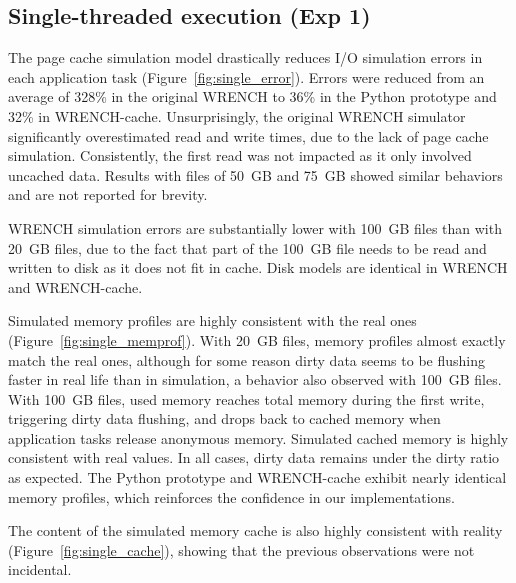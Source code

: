 \documentclass[conference]{IEEEtran}
\newcommand{\wrench}{WRENCH\xspace}
\begin{document}
        \subsection{Single-threaded execution (Exp 1)}


        The page cache simulation model drastically reduces I/O simulation
        errors in each application task (Figure~\ref{fig:single_error}). Errors were reduced from an average
        of 328\% in the original \wrench to 36\% in the Python prototype and
        32\% in \wrench-cache. Unsurprisingly, the original \wrench simulator
        significantly overestimated read and write times, due to the lack
        of page cache simulation. Consistently, the first read was not impacted
        as it only involved uncached data. Results with files of 50~GB and 75~GB
        showed similar behaviors and are not reported for brevity.

        \wrench simulation errors are substantially lower with 100~GB
        files than with 20~GB files, due to the fact that part of the
        100~GB file needs to be read and written to disk as it does not fit in cache. Disk models are
        identical in WRENCH and WRENCH-cache.

        Simulated memory profiles are highly consistent with the real ones
        (Figure~\ref{fig:single_memprof}). With 20~GB files, memory profiles almost exactly match the
        real ones, although for some reason dirty data seems to be flushing faster in real
        life than in simulation, a behavior also
        observed with 100~GB files. With 100~GB files, used memory reaches
        total memory during the first write, triggering dirty data
        flushing, and drops back to cached memory when application tasks
        release anonymous memory. Simulated cached memory is highly
        consistent with real values. In all cases, dirty data remains under the dirty ratio as
        expected. The Python prototype and \wrench-cache exhibit nearly
        identical memory profiles, which reinforces the confidence in our
        implementations.

        The content of the simulated memory cache is also highly consistent
        with reality (Figure~\ref{fig:single_cache}), showing that the
        previous observations were not incidental.
\end{document}
